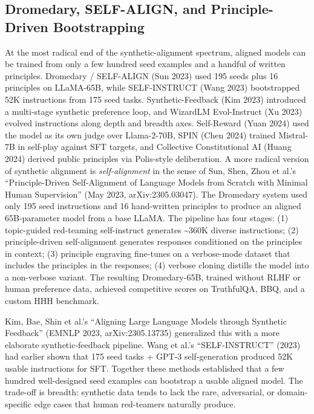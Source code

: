 \subsection{Dromedary, SELF-ALIGN, and Principle-Driven Bootstrapping}\label{dromedary-self-align-and-principle-driven-bootstrapping}

At the most radical end of the synthetic-alignment spectrum, aligned models can be trained from only a few hundred seed examples and a handful of written principles. Dromedary / SELF-ALIGN (Sun 2023) used 195 seeds plus 16 principles on LLaMA-65B, while SELF-INSTRUCT (Wang 2023) bootstrapped 52K instructions from 175 seed tasks. Synthetic-Feedback (Kim 2023) introduced a multi-stage synthetic preference loop, and WizardLM Evol-Instruct (Xu 2023) evolved instructions along depth and breadth axes. Self-Reward (Yuan 2024) used the model as its own judge over Llama-2-70B, SPIN (Chen 2024) trained Mistral-7B in self-play against SFT targets, and Collective Constitutional AI (Huang 2024) derived public principles via Polis-style deliberation. A more radical version of synthetic alignment is \emph{self-alignment} in the sense of Sun, Shen, Zhou et al.'s ``Principle-Driven Self-Alignment of Language Models from Scratch with Minimal Human Supervision'' (May 2023, arXiv:2305.03047). The Dromedary system used only 195 seed instructions and 16 hand-written principles to produce an aligned 65B-parameter model from a base LLaMA. The pipeline has four stages: (1) topic-guided red-teaming self-instruct generates \textasciitilde360K diverse instructions; (2) principle-driven self-alignment generates responses conditioned on the principles in context; (3) principle engraving fine-tunes on a verbose-mode dataset that includes the principles in the responses; (4) verbose cloning distills the model into a non-verbose variant. The resulting Dromedary-65B, trained without RLHF or human preference data, achieved competitive scores on TruthfulQA, BBQ, and a custom HHH benchmark.

Kim, Bae, Shin et al.'s ``Aligning Large Language Models through Synthetic Feedback'' (EMNLP 2023, arXiv:2305.13735) generalized this with a more elaborate synthetic-feedback pipeline. Wang et al.'s ``SELF-INSTRUCT'' (2023) had earlier shown that 175 seed tasks + GPT-3 self-generation produced 52K usable instructions for SFT. Together these methods established that a few hundred well-designed seed examples can bootstrap a usable aligned model. The trade-off is breadth: synthetic data tends to lack the rare, adversarial, or domain-specific edge cases that human red-teamers naturally produce.

